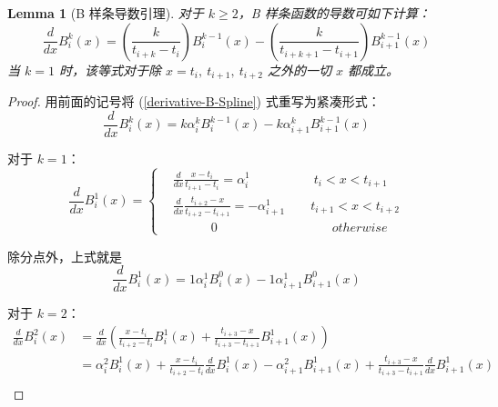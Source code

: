 \documentclass[a4paper]{article}
\newtheorem{lemma}{Lemma}
\begin{document}
    \begin{lemma}[B 样条导数引理]
        \label{lemma-B-Spline-derivative}
        对于 $k \geqslant 2$，B 样条函数的导数可如下计算：
        \begin{equation}
        \label{derivative-B-Spline}
            \frac{d}{dx} B_{i}^{k}(x) = \left(\frac{k}{t_{i+k} - t_{i}}\right) B_{i}^{k-1}(x) - \left(\frac{k}{t_{i+k+1} - t_{i+1}}\right) B_{i+1}^{k-1}(x)
        \end{equation}
        当 $k = 1$ 时，该等式对于除 $x = t_{i},\ t_{i+1},\ t_{i+2}$ 之外的一切 $x$ 都成立。
    \end{lemma}
    \begin{proof}[Proof]
        用前面的记号将 (\ref{derivative-B-Spline}) 式重写为紧凑形式：
        \begin{equation*}
            \frac{d}{dx} B_i^k(x) = k \alpha_i^k B_{i}^{k-1}(x) - k \alpha_{i+1}^{k} B_{i+1}^{k-1}(x)
        \end{equation*}

        \noindent 对于 $k = 1$：
        \begin{equation*}
            \frac{d}{dx} B_i^1(x) = \left\{\begin{aligned}
                & \frac{d}{dx} \frac{x - t_{i}}{t_{i+1} - t_{i}} = \alpha_i^1 \qquad\qquad\quad t_{i} < x < t_{i+1} \\
                & \frac{d}{dx} \frac{t_{i+2} - x}{t_{i+2} - t_{i+1}} = -\alpha_{i+1}^1 \qquad t_{i+1} < x < t_{i+2} \\
                & \quad\qquad 0 \qquad\qquad\qquad\qquad\quad otherwise
            \end{aligned}\right.
        \end{equation*}
        
        \noindent 除分点外，上式就是
        \begin{equation}
        \label{case-k-1}
            \frac{d}{dx} B_{i}^{1}(x) = 1 \alpha_{i}^{1} B_{i}^{0}(x) - 1 \alpha_{i+1}^{1} B_{i+1}^{0}(x)
        \end{equation}

        \noindent 对于 $k = 2$：
        \begin{equation*}
            \begin{aligned}
                \frac{d}{dx} B_i^2(x) & = \frac{d}{dx} \left( \frac{x - t_{i}}{t_{i+2} - t_{i}} B_{i}^{1}(x) + \frac{t_{i+3} - x}{t_{i+3} - t_{i+1}} B_{i+1}^{1}(x) \right) \\
                & = \alpha_{i}^{2} B_{i}^{1}(x) + \frac{x - t_{i}}{t_{i+2} - t_{i}} \frac{d}{dx} B_{i}^{1}(x) - \alpha_{i+1}^{2} B_{i+1}^{1}(x) + \frac{t_{i+3} - x}{t_{i+3} - t_{i+1}} \frac{d}{dx} B_{i+1}^{1}(x) \\
            \end{aligned}
        \end{equation*}


\end{proof}
\end{document}
